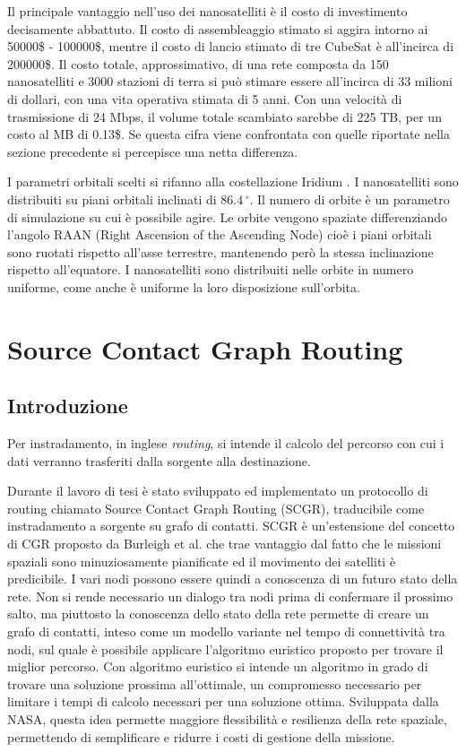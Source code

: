 \documentclass[12pt,a4paper,oneside]{book}
\begin{document}
		Il principale vantaggio nell'uso dei nanosatelliti è il costo di investimento decisamente abbattuto. Il costo di assembleaggio stimato si aggira intorno ai 50000\$ - 100000\$, mentre il costo di lancio stimato di tre CubeSat è all'incirca di 200000\$. Il costo totale, approssimativo, di una rete composta da 150 nanosatelliti e 3000 stazioni di terra si può stimare essere all'incirca di 33 milioni di dollari, con una vita operativa stimata di 5 anni. Con una velocità di trasmissione di 24 Mbps, il volume totale scambiato sarebbe di 225 TB, per un costo al MB di 0.13\$. Se questa cifra viene confrontata con quelle riportate nella sezione precedente si percepisce una netta differenza.
		
		I parametri orbitali scelti si rifanno alla costellazione Iridium \cite{fossa1998overview}. I nanosatelliti sono distribuiti su piani orbitali inclinati di $86.4\,^{\circ}$. Il numero di orbite è un parametro di simulazione su cui è possibile agire. Le orbite vengono spaziate differenziando l'angolo RAAN (Right Ascension of the Ascending Node) cioè i piani orbitali sono ruotati rispetto all'asse terrestre, mantenendo però la stessa inclinazione rispetto all'equatore. I nanosatelliti sono distribuiti nelle orbite in numero uniforme, come anche è uniforme la loro disposizione sull'orbita. 
		
		
	\chapter{Source Contact Graph Routing}
	
		\section{Introduzione}
		Per instradamento, in inglese {\it routing}, si intende il calcolo del percorso con cui i dati verranno trasferiti dalla sorgente alla destinazione.
		
		Durante il lavoro di tesi è stato sviluppato ed implementato un protocollo di routing chiamato Source Contact Graph Routing (SCGR), traducibile come instradamento a sorgente su grafo di contatti. SCGR è un'estensione del concetto di CGR proposto da Burleigh et al. \cite{burleigh2010contact} che trae vantaggio dal fatto che le missioni spaziali sono minuziosamente pianificate ed il movimento dei satelliti è predicibile. I vari nodi possono essere quindi a conoscenza di un futuro stato della rete. Non si rende necessario un dialogo tra nodi prima di confermare il prossimo salto, ma piuttosto la conoscenza dello stato della rete permette di creare un grafo di contatti, inteso come un modello variante nel tempo di connettività tra nodi, sul quale è possibile applicare l'algoritmo euristico proposto per trovare il miglior percorso. Con algoritmo euristico si intende un algoritmo in grado di trovare una soluzione prossima all'ottimale, un compromesso necessario per limitare i tempi di calcolo necessari per una soluzione ottima. Sviluppata dalla NASA, questa idea permette maggiore flessibilità e resilienza della rete spaziale, permettendo di semplificare e ridurre i costi di gestione della missione.
		
\end{document}
